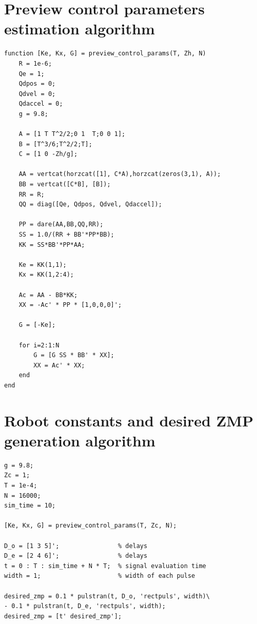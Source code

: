 \documentclass[12pt,a4paper]{report}
\begin{document}
	\begin{appendices}
		\chapter{Preview control parameters estimation algorithm}
			\begin{lstlisting}
function [Ke, Kx, G] = preview_control_params(T, Zh, N)
	R = 1e-6;
	Qe = 1;
	Qdpos = 0;
	Qdvel = 0;
	Qdaccel = 0;
	g = 9.8;
	
	A = [1 T T^2/2;0 1  T;0 0 1];
	B = [T^3/6;T^2/2;T];
	C = [1 0 -Zh/g];
	
	AA = vertcat(horzcat([1], C*A),horzcat(zeros(3,1), A));
	BB = vertcat([C*B], [B]);
	RR = R;
	QQ = diag([Qe, Qdpos, Qdvel, Qdaccel]);
	
	PP = dare(AA,BB,QQ,RR);
	SS = 1.0/(RR + BB'*PP*BB);
	KK = SS*BB'*PP*AA;
	
	Ke = KK(1,1);
	Kx = KK(1,2:4);
	
	Ac = AA - BB*KK;
	XX = -Ac' * PP * [1,0,0,0]';
	
	G = [-Ke];
	
	for i=2:1:N
		G = [G SS * BB' * XX];
		XX = Ac' * XX;
	end
end
			\end{lstlisting}
		\chapter{Robot constants and desired ZMP generation algorithm}
			\begin{lstlisting}
g = 9.8;
Zc = 1;
T = 1e-4;
N = 16000;
sim_time = 10;

[Ke, Kx, G] = preview_control_params(T, Zc, N);

D_o = [1 3 5]';                % delays
D_e = [2 4 6]';                % delays
t = 0 : T : sim_time + N * T;  % signal evaluation time
width = 1;                     % width of each pulse

desired_zmp = 0.1 * pulstran(t, D_o, 'rectpuls', width)\
- 0.1 * pulstran(t, D_e, 'rectpuls', width);
desired_zmp = [t' desired_zmp'];
			\end{lstlisting}
	\end{appendices}
  
\end{document}

